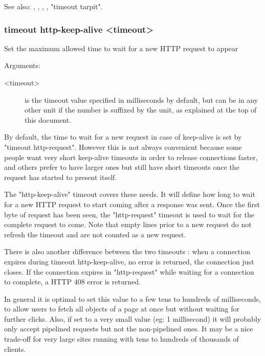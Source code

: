   See also: , , , ,
            "timeout tarpit".


\subsubsection[timeout http-keep-alive]{timeout http-keep-alive <timeout>}


  Set the maximum allowed time to wait for a new HTTP request to appear


  Arguments:
  \begin{description}
  \item[<timeout>] is the timeout value specified in milliseconds by default, but
              can be in any other unit if the number is suffixed by the unit,
              as explained at the top of this document.
  \end{description}

  By default, the time to wait for a new request in case of keep-alive is set
  by "timeout http-request". However this is not always convenient because some
  people want very short keep-alive timeouts in order to release connections
  faster, and others prefer to have larger ones but still have short timeouts
  once the request has started to present itself.

  The "http-keep-alive" timeout covers these needs. It will define how long to
  wait for a new HTTP request to start coming after a response was sent. Once
  the first byte of request has been seen, the "http-request" timeout is used
  to wait for the complete request to come. Note that empty lines prior to a
  new request do not refresh the timeout and are not counted as a new request.

  There is also another difference between the two timeouts : when a connection
  expires during timeout http-keep-alive, no error is returned, the connection
  just closes. If the connection expires in "http-request" while waiting for a
  connection to complete, a HTTP 408 error is returned.

  In general it is optimal to set this value to a few tens to hundreds of
  milliseconds, to allow users to fetch all objects of a page at once but
  without waiting for further clicks. Also, if set to a very small value (eg:
  1 millisecond) it will probably only accept pipelined requests but not the
  non-pipelined ones. It may be a nice trade-off for very large sites running
  with tens to hundreds of thousands of clients.

